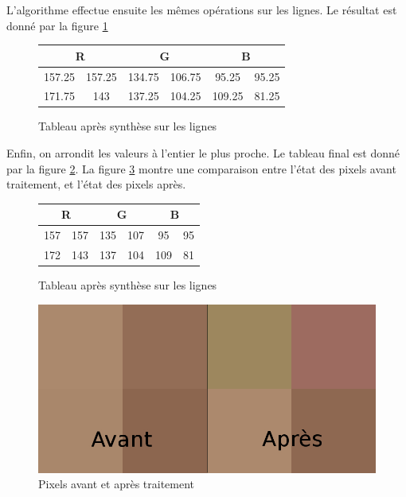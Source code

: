 \documentclass{article}
\begin{document}
L'algorithme effectue ensuite les mêmes opérations sur les lignes. Le résultat est donné par la figure  \ref{tab6}

\begin{figure}[!h]
\begin{center}
\begin{tabular}{|c|c|c|c|c|c|}
\hline
\multicolumn{2}{|c|}{R} & \multicolumn{2}{|c|}{G}  & \multicolumn{2}{|c|}{B} \\
\hline
157.25    & 157.25   &   134.75  & 106.75 &   95.25  & 95.25   \\ 
\hline
171.75    & 143   &   137.25  & 104.25 &   109.25  & 81.25 \\
\hline
\end{tabular}
\end{center}
\caption{Tableau après synthèse sur les lignes}
\label{tab6}
\end{figure}

Enfin, on arrondit les valeurs à l'entier le plus proche. Le tableau final est donné par la figure \ref{tab7}. La figure \ref{after} montre une comparaison entre l'état des pixels avant traitement, et l'état des pixels après.

\begin{figure}[!h]
\begin{center}
\begin{tabular}{|c|c|c|c|c|c|}
\hline
\multicolumn{2}{|c|}{R} & \multicolumn{2}{|c|}{G}  & \multicolumn{2}{|c|}{B} \\
\hline
157    & 157  &   135  & 107 &   95  & 95   \\ 
\hline
172   & 143   &   137  & 104 &   109  & 81 \\
\hline
\end{tabular}
\end{center}
\caption{Tableau après synthèse sur les lignes}
\label{tab7}
\end{figure}

\begin{figure}[!h]
\centering
\includegraphics[scale=0.4]{aprescompress.jpg}
\caption{Pixels avant et après traitement}
\label{after}
\end{figure}
\end{document}
